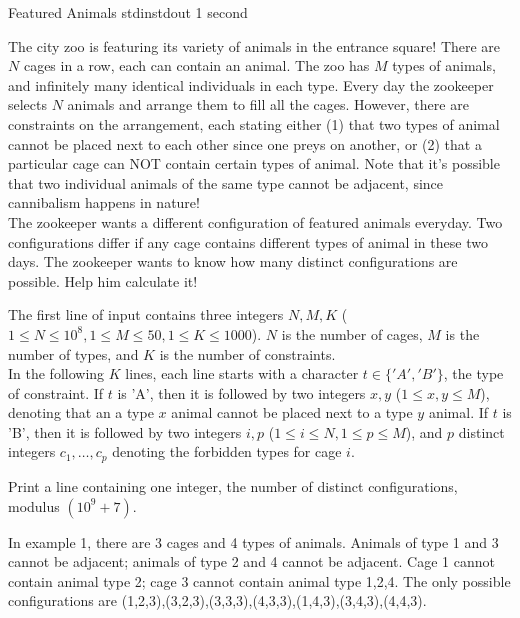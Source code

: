 \begin{problem}{Featured Animals}
{stdin}{stdout}
{1 second}{}{}

The city zoo is featuring its variety of animals in the entrance square! There are $N$ cages in a row, each can contain an animal. The zoo has $M$ types of animals, and infinitely many identical individuals in each type. Every day the zookeeper selects $N$ animals and arrange them to fill all the cages. However, there are constraints on the arrangement, each stating either (1) that two types of animal cannot be placed next to each other since one preys on another, or (2) that a particular cage can NOT contain certain types of animal. Note that it's possible that two individual animals of the same type cannot be adjacent, since cannibalism happens in nature! \\

The zookeeper wants a different configuration of featured animals everyday. Two configurations differ if any cage contains different types of animal in these two days. The zookeeper wants to know how many distinct configurations are possible. Help him calculate it! 

\InputFile

The first line of input contains three integers $N, M, K$ ($1 \le N \le 10^8, 1 \le M \le 50, 1 \le K \le 1000$). $N$ is the number of cages, $M$ is the number of types, and $K$ is the number of constraints. \\
In the following $K$ lines, each line starts with a character $t \in \{'A','B'\}$, the type of constraint. If $t$ is 'A', then it is followed by two integers $x, y$ ($1 \le x, y \le M$), denoting that an a type $x$ animal cannot be placed next to a type $y$ animal. If $t$ is 'B', then it is followed by two integers $i, p$ ($1 \le i \le N, 1 \le p \le M$), and $p$ distinct integers $c_1, \hdots, c_p$ denoting the forbidden types for cage $i$. 

\OutputFile

Print a line containing one integer, the number of distinct configurations, modulus $(10^9+7)$. 

\Examples

\begin{example}
%
%
\end{example}

\Notes

In example 1, there are 3 cages and 4 types of animals. Animals of type 1 and 3 cannot be adjacent; animals of type 2 and 4 cannot be adjacent. Cage 1 cannot contain animal type 2; cage 3 cannot contain animal type 1,2,4. The only possible configurations are (1,2,3),(3,2,3),(3,3,3),(4,3,3),(1,4,3),(3,4,3),(4,4,3). 

\end{problem}
